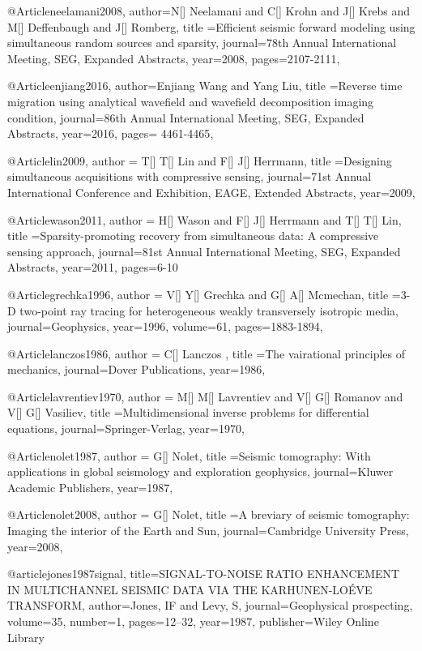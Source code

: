 @Article{neelamani2008,
  author={N[] Neelamani and C[] Krohn and J[] Krebs and M[] Deffenbaugh and J[] Romberg},
  title ={Efficient seismic forward modeling using simultaneous random sources and sparsity},
  journal={78th Annual International Meeting, SEG, Expanded Abstracts},
  year=2008,
  pages={2107-2111},
}

@Article{enjiang2016,
  author={Enjiang Wang and Yang Liu},
  title ={Reverse time migration using analytical wavefield and wavefield decomposition imaging
condition},
  journal={86th Annual International Meeting, SEG, Expanded Abstracts},
  year=2016,
  pages={ 4461-4465},
}

@Article{lin2009,
  author = {T[] T[] Lin and F[] J[] Herrmann},
  title ={Designing simultaneous acquisitions with compressive sensing},
  journal={71st Annual International Conference and Exhibition, EAGE, Extended Abstracts},
  year=2009,
}

@Article{wason2011,
  author = {H[] Wason and F[] J[] Herrmann and T[] T[] Lin},
  title ={Sparsity-promoting recovery from simultaneous data: A compressive sensing approach},
  journal={81st Annual International Meeting, SEG, Expanded Abstracts},
  year=2011,
  pages={6-10}
}

@Article{grechka1996,
  author = {V[] Y[] Grechka and G[] A[] Mcmechan},
  title ={3-D two-point ray tracing for heterogeneous weakly transversely isotropic media},
  journal={Geophysics},
  year=1996,
  volume=61,
  pages={1883-1894},
}

@Article{lanczos1986,
  author = {C[] Lanczos },
  title ={The vairational principles of mechanics},
  journal={Dover Publications},
  year=1986,
}

@Article{lavrentiev1970,
  author = {M[] M[] Lavrentiev and V[] G[] Romanov and V[] G[] Vasiliev},
  title ={Multidimensional inverse problems for differential equations},
  journal={Springer-Verlag},
  year=1970,
}

@Article{nolet1987,
  author = {G[] Nolet},
  title ={Seismic tomography: With applications in global seismology and exploration geophysics},
  journal={Kluwer Academic Publishers},
  year=1987,
}

@Article{nolet2008,
  author = {G[] Nolet},
  title ={A breviary of seismic tomography: Imaging the interior of the Earth and Sun},
  journal={Cambridge University Press},
  year=2008,
}

@article{jones1987signal,
  title={SIGNAL-TO-NOISE RATIO ENHANCEMENT IN MULTICHANNEL SEISMIC DATA VIA THE KARHUNEN-LO{\'E}VE TRANSFORM},
  author={Jones, IF and Levy, S},
  journal={Geophysical prospecting},
  volume={35},
  number={1},
  pages={12--32},
  year={1987},
  publisher={Wiley Online Library}
}

